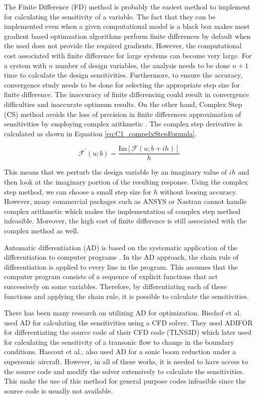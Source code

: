 The Finite Difference (FD) method is probably the easiest method to implement for calculating the sensitivity of a variable. The fact that they can be implemented even when a given computational model is a black box makes most gradient based optimzation algorithms perform finite differences by default when the used does not provide the required gradients. However, the computational cost associated with finite difference for large systems can become very large. For a system with $n$ number of design variables, the analysis needs to be done $n+1$ time to calculate the design sensitivities. Furthermore, to ensure the accuracy, convergence study needs to be done for selecting the appropriate step size for finite difference. The inaccuracy of finite differencing could result in convergence difficulties and inaccurate optimum results. On the other hand, Complex Step (CS) method avoids the loss of precision in finite differences approximation of sensitivities by employing complex arithmetic \cite{martins2003complex}. The complex step derivative is calculated as shown in Equation \eqref{eq:C1_compelxStepFormula}.

\begin{equation}\label{eq:C1_compelxStepFormula}
	\mathcal{F}^\prime\left(u; b\right) = \frac{\text{Im}\left[ \mathcal{F}\left(u; b + ih\right) \right]}{h}
\end{equation}

This means that we perturb the design variable by an imaginary value of $ih$ and then look at
the imaginary portion of the resulting response. Using the complex step method, we can choose a
small step size for $h$ without loosing accuracy. However, many commercial packages such as ANSYS or Nastran cannot handle complex arithmetic which makes the implementation of complex step method infeasible. Moreover, the high cost of finite difference is still associated with the complex method as well.

Automatic differentiation (AD) is based on the systematic application of the differentiation to computer programs \cite{naumann2012art}. In the AD approach, the chain rule of differentiation is applied to every line in the program. This assumes that the computer program consists of a sequence of explicit functions that act successively on some variables. Therefore, by differentiating each of these functions and applying the chain rule, it is possible to calculate the sensitivities. 

There has been many research on utilizing AD for optimization. Bischof et al. used AD for calculating the sensitivities using a CFD solver. They used ADIFOR for differentiating the source code of their CFD code (TLNS3D) which later used for calculating the sensitivity of a transonic flow to change in the boundary conditions. Hascout et al., also used AD for a sonic boom reduction under a supersonic aircraft. However, in all of these works, it is needed to have access to the source code and modify the solver extensively to calculate the sensitivities. This make the use of this method for general purpose codes infeasible since the source code is usually not available.

